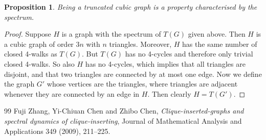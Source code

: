 \documentclass[10pt,a4paper]{amsart}
\newtheorem{proposition}{Proposition}
\begin{document}
\begin{proposition}
Being a truncated cubic graph is a property characterised by the spectrum.
\end{proposition}

\begin{proof}
Suppose $H$ is a graph with the spectrum of $T(G)$ given above.
Then $H$ is a cubic graph of order $3n$ with $n$ triangles.
Moreover, $H$ has the same number of closed 4-walks as $T(G)$.
But $T(G)$ has no 4-cycles and therefore only trivial closed 4-walks.
So also $H$ has no 4-cycles, which implies that all triangles are 
disjoint, and that two triangles are connected by at most one edge.
Now we define the graph $G'$ whose vertices are the triangles, 
where triangles are adjacent whenever they are connected by an edge in 
$H$. 
Then clearly $H=T(G')$.
\end{proof}

\begin{thebibliography}{99}
 Fuji Zhang, Yi-Chiuan Chen and Zhibo Chen, {\em Clique-inserted-graphs and spectral dynamics of clique-inserting}, Journal of Mathematical Analysis and Applications 349 (2009), 211--225.
\end{thebibliography}
\end{document}
